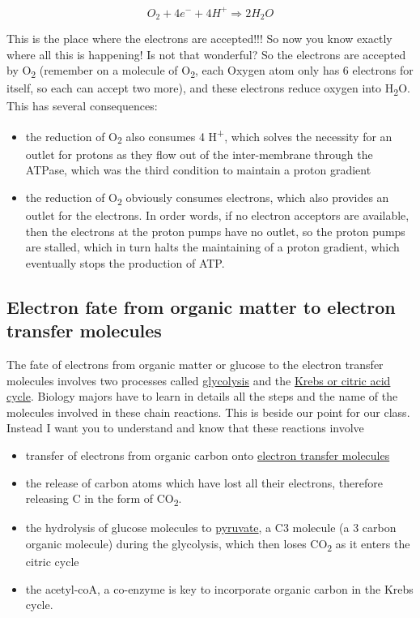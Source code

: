 \documentclass[]{book}
\providecommand{\tightlist}{%
  \setlength{\itemsep}{0pt}\setlength{\parskip}{0pt}}
\theoremstyle{definition}
\theoremstyle{definition}
\theoremstyle{definition}
\theoremstyle{remark}
\begin{document}
\begin{equation}
O_2 + 4 e^- + 4 H^+ \Rightarrow 2 H_2O
\label{eq:O2reduction}
\end{equation}

This is the place where the electrons are accepted!!! So now you know
exactly where all this is happening! Is not that wonderful? So the
electrons are accepted by O\textsubscript{2} (remember on a molecule of
O\textsubscript{2}, each Oxygen atom only has 6 electrons for itself, so
each can accept two more), and these electrons reduce oxygen into
H\textsubscript{2}O. This has several consequences:

\begin{itemize}
\tightlist
\item
  the reduction of O\textsubscript{2} also consumes 4
  H\textsuperscript{+}, which solves the necessity for an outlet for
  protons as they flow out of the inter-membrane through the ATPase,
  which was the third condition to maintain a proton gradient
\item
  the reduction of O\textsubscript{2} obviously consumes electrons,
  which also provides an outlet for the electrons. In order words, if no
  electron acceptors are available, then the electrons at the proton
  pumps have no outlet, so the proton pumps are stalled, which in turn
  halts the maintaining of a proton gradient, which eventually stops the
  production of ATP.
\end{itemize}

\subsection{Electron fate from organic matter to electron transfer
molecules}\label{electron-fate-from-organic-matter-to-electron-transfer-molecules}

The fate of electrons from organic matter or glucose to the electron
transfer molecules involves two processes called
\protect\hyperlink{glycolysis}{glycolysis} and the
\protect\hyperlink{krebscycle}{Krebs or citric acid cycle}. Biology
majors have to learn in details all the steps and the name of the
molecules involved in these chain reactions. This is beside our point
for our class. Instead I want you to understand and know that these
reactions involve

\begin{itemize}
\tightlist
\item
  transfer of electrons from organic carbon onto
  \protect\hyperlink{electron-transfer-molecules-that-power-the-proton-pumps}{electron
  transfer molecules}
\item
  the release of carbon atoms which have lost all their electrons,
  therefore releasing C in the form of CO\textsubscript{2}.
\item
  the hydrolysis of glucose molecules to
  \href{https://en.wikipedia.org/wiki/Pyruvic_acid}{pyruvate}, a C3
  molecule (a 3 carbon organic molecule) during the glycolysis, which
  then loses CO\textsubscript{2} as it enters the citric cycle
\item
  the acetyl-coA, a co-enzyme is key to incorporate organic carbon in
  the Krebs cycle.
\end{itemize}
\end{document}

